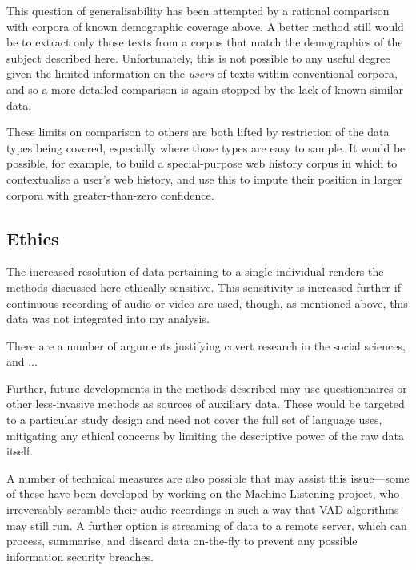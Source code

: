 This question of generalisability has been attempted by a rational comparison with corpora of known demographic coverage above.  A better method still would be to extract only those texts from a corpus that match the demographics of the subject described here.  Unfortunately, this is not possible to any useful degree given the limited information on the \textit{users} of texts within conventional corpora, and so a more detailed comparison is again stopped by the lack of known-similar data.

These limits on comparison to others are both lifted by restriction of the data types being covered, especially where those types are easy to sample.  It would be possible, for example, to build a special-purpose web history corpus in which to contextualise a user's web history, and use this to impute their position in larger corpora with greater-than-zero confidence.






\subsection{Ethics}
\label{sec:personal:discussion:ethics}
The increased resolution of data pertaining to a single individual renders the methods discussed here ethically sensitive.  This sensitivity is increased further if continuous recording of audio or video are used, though, as mentioned above, this data was not integrated into my analysis.

There are a number of arguments justifying covert research in the social sciences, and ...


Further, future developments in the methods described may use questionnaires or other less-invasive methods as sources of auxiliary data.  These would be targeted to a particular study design and need not cover the full set of language uses, mitigating any ethical concerns by limiting the descriptive power of the raw data itself.

A number of technical measures are also possible that may assist this issue---some of these have been developed by  working on the Machine Listening project, who irreversably scramble their audio recordings in such a way that VAD algorithms may still run.  A further option is streaming of data to a remote server, which can process, summarise, and discard data on-the-fly to prevent any possible information security breaches.











